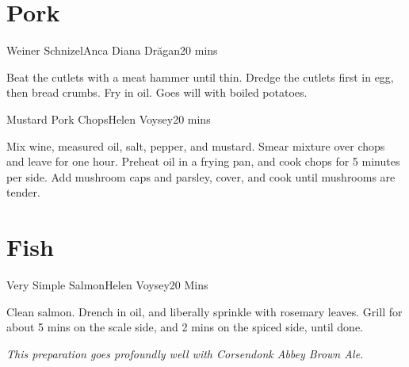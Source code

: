 \documentclass{book}
\begin{document}
\chapter{Pork}
\begin{recipe}{Weiner Schnizel}{Anca Diana Dr\u{a}gan}{20 mins}
  
  Beat the cutlets with a meat hammer until thin. Dredge the cutlets first in
  egg, then bread crumbs. Fry in oil. Goes will with boiled potatoes.
\end{recipe}
\begin{recipe}{Mustard Pork Chops}{Helen Voysey}{20 mins}

  Mix wine, measured oil, salt, pepper, and mustard. Smear mixture over chops
  and leave for one hour. Preheat oil in a frying pan, and cook chops for 5
  minutes per side. Add mushroom caps and parsley, cover, and cook until
  mushrooms are tender.
\end{recipe}
\chapter{Fish}
\begin{recipe}{Very Simple Salmon}{Helen Voysey}{20 Mins}

  Clean salmon. Drench in oil, and liberally sprinkle with rosemary
  leaves. Grill for about 5 mins on the scale side, and 2 mins on the spiced
  side, until done.
\end{recipe}
\textit{This preparation goes profoundly well with Corsendonk Abbey Brown
  Ale.}
\end{document}
